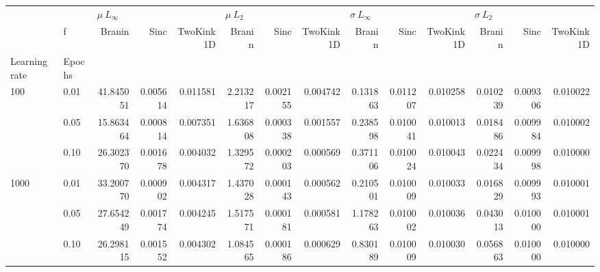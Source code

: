 \begin{tabular}{llrrrrrrrrrrrr}
\toprule
     & {} & \multicolumn{3}{l}{$\mu\ L_\infty$} & \multicolumn{3}{l}{$\mu\ L_2$} & \multicolumn{3}{l}{$\sigma\ L_\infty$} & \multicolumn{3}{l}{$\sigma\ L_2$} \\
     & f &          Branin &      Sinc & TwoKink1D &     Branin &      Sinc & TwoKink1D &             Branin &      Sinc & TwoKink1D &        Branin &      Sinc & TwoKink1D \\
Learning rate & Epochs &                 &           &           &            &           &           &                    &           &           &               &           &           \\
\midrule
100  & 0.01 &       41.845051 &  0.005614 &  0.011581 &   2.213217 &  0.002155 &  0.004742 &           0.131863 &  0.011207 &  0.010258 &      0.010239 &  0.009306 &  0.010022 \\
     & 0.05 &       15.863464 &  0.000814 &  0.007351 &   1.636808 &  0.000338 &  0.001557 &           0.238598 &  0.010041 &  0.010013 &      0.018486 &  0.009984 &  0.010002 \\
     & 0.10 &       26.302370 &  0.001678 &  0.004032 &   1.329572 &  0.000203 &  0.000569 &           0.371106 &  0.010024 &  0.010043 &      0.022434 &  0.009998 &  0.010000 \\
1000 & 0.01 &       33.200770 &  0.000902 &  0.004317 &   1.437028 &  0.000143 &  0.000562 &           0.210501 &  0.010009 &  0.010033 &      0.016829 &  0.009993 &  0.010001 \\
     & 0.05 &       27.654249 &  0.001774 &  0.004245 &   1.517571 &  0.000181 &  0.000581 &           1.178263 &  0.010002 &  0.010036 &      0.043013 &  0.010000 &  0.010001 \\
     & 0.10 &       26.298115 &  0.001552 &  0.004302 &   1.084565 &  0.000186 &  0.000629 &           0.830189 &  0.010009 &  0.010030 &      0.056863 &  0.010000 &  0.010000 \\
\bottomrule
\end{tabular}
